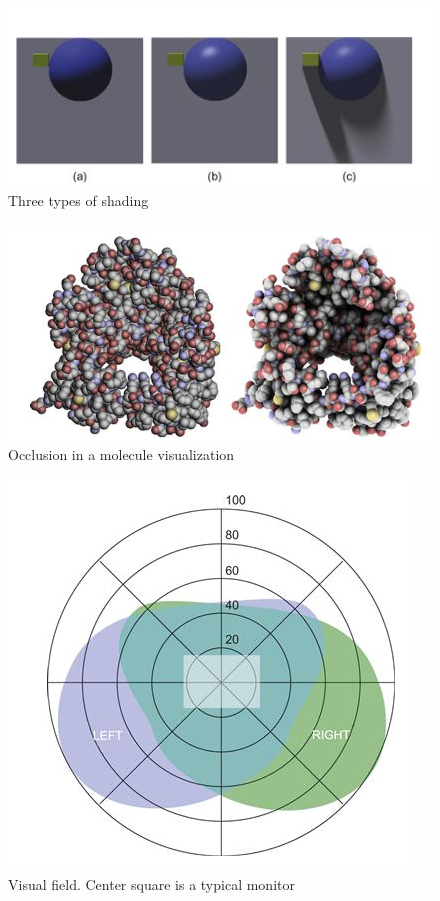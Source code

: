 \begin{mdframed}\begin{multicols}{3}
    \begin{figure}[H]
        \centering
        \includegraphics[width=\linewidth]{shading.png}
        \caption{Three types of shading}
    \end{figure}
    \begin{figure}[H]
        \centering
        \includegraphics[width=\linewidth]{occlusion.png}
        \caption{Occlusion in a molecule visualization}
    \end{figure}

    \begin{figure}[H]
        \centering
        \includegraphics[width=0.6\linewidth]{visual_field.png}
        \caption{Visual field. Center square is a typical monitor}
    \end{figure}
\end{multicols}\end{mdframed}


